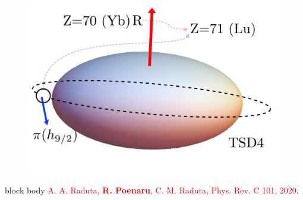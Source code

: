 \documentclass{beamer}
\begin{document}
\begin{frame}
\begin{figure}
		\includegraphics[scale=0.22]{figures/triaxial-shapes-oddA-2.pdf}
	\end{figure}
	\vspace{-0.5cm}
	\begin{beamercolorbox}[rounded=true,shadow=false, wd=\linewidth,]{block body}
		\centering
		\textcolor{red}{\footnotesize{A. A. Raduta, \textbf{R. Poenaru}, C. M. Raduta, Phys. Rev. C 101, 2020.}}
	\end{beamercolorbox}
\end{frame}
\end{document}
